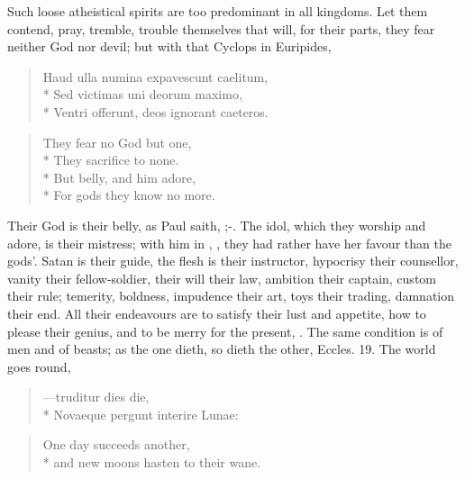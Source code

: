 {Such loose atheistical spirits are too predominant in all
kingdoms. Let them contend, pray, tremble, trouble themselves that
will, for their parts, they fear neither God nor devil; but with that
Cyclops in Euripides,

\begin{latin}
\begin{verse}
Haud ulla numina expavescunt caelitum,\\*
Sed victimas uni deorum maximo,\\*
Ventri offerunt, deos ignorant caeteros.
\end{verse}
\end{latin}

\begin{verse}
They fear no God but one,\\*
They sacrifice to none.\\*
But belly, and him adore,\\*
For gods they know no more.
\end{verse}

Their God is their belly, as Paul saith, ;-. The idol, which they worship and
adore, is their mistress; with him in \Plautus{}, , they had rather have her favour than the gods'. Satan is
their guide, the flesh is their instructor, hypocrisy their counsellor,
vanity their fellow-soldier, their will their law, ambition their
captain, custom their rule; temerity, boldness, impudence their art,
toys their trading, damnation their end. All their endeavours are to
satisfy their lust and appetite, how to please their genius, and to be
merry for the present, . The same condition is of men and of beasts; as the one
dieth, so dieth the other, Eccles.  19. The world goes round,

\begin{latin}%
\begin{verse}%
---truditur dies die,\\*
Novaeque pergunt interire Lunae:
\end{verse}%
\end{latin}%
\translationrule%
\begin{verse}
One day succeeds another,\\*
and new moons hasten to their wane.
\end{verse}%

}
